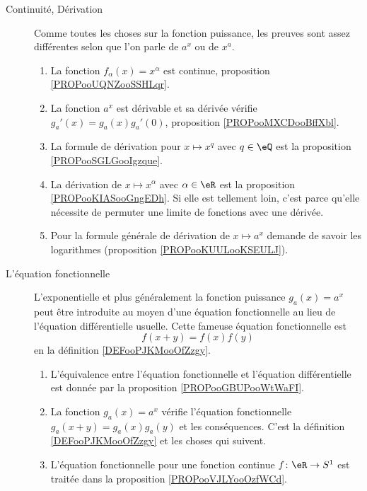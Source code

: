 \begin{description}
	\item[Continuité, Dérivation]
	      Comme toutes les choses sur la fonction puissance, les preuves sont assez différentes selon que l'on parle de \( a^x\) ou de \( x^a\).
	      \begin{enumerate}
		      \item
		            La fonction \( f_{\alpha}(x)=x^{\alpha}\) est continue, proposition \ref{PROPooUQNZooSSHLqr}.
		      \item
		            La fonction \( a^x\) est dérivable et sa dérivée vérifie \( g_a'(x)=g_a(x)g_a'(0)\), proposition \ref{PROPooMXCDooBffXbl}.
		      \item
		            La formule de dérivation pour \( x\mapsto x^q\) avec \( q\in \eQ\) est la proposition \ref{PROPooSGLGooIgzque}.
		      \item
		            La dérivation de \( x\mapsto x^{\alpha}\) avec \( \alpha\in \eR\) est la proposition \ref{PROPooKIASooGngEDh}. Si elle est tellement loin, c'est parce qu'elle nécessite de permuter une limite de fonctions avec une dérivée.
		      \item
		            Pour la formule générale de dérivation de \( x\mapsto a^x\) demande de savoir les logarithmes (proposition \ref{PROPooKUULooKSEULJ}).
	      \end{enumerate}

	\item[L'équation fonctionnelle]
	      L'exponentielle et plus généralement la fonction puissance \( g_a(x)=a^x\) peut être introduite au moyen d'une équation fonctionnelle au lieu de l'équation différentielle usuelle. Cette fameuse équation fonctionnelle est
	      \begin{equation}
		      f(x+y)=f(x)f(y)
	      \end{equation}
	      en la définition \ref{DEFooPJKMooOfZzgy}.
	      \begin{enumerate}
		      \item
		            L'équivalence entre l'équation fonctionnelle et l'équation différentielle est donnée par la proposition \ref{PROPooGBUPooWtWaFI}.
		      \item
		            La fonction \( g_a(x)=a^x\) vérifie l'équation fonctionnelle \( g_a(x+y)=g_a(x)g_a(y)\) et les conséquences. C'est la définition \ref{DEFooPJKMooOfZzgy} et les choses qui suivent.
		      \item
		            L'équation fonctionnelle pour une fonction continue \( f\colon \eR\to S^1\) est traitée dans la proposition \ref{PROPooVJLYooOzfWCd}.
	      \end{enumerate}
\end{description}


